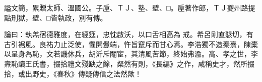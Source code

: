 \begin{pinyinscope}
 謚文簡，累贈太師、溫國公。子垕、ＴＪ、塾、壁、□。垕著作郎，ＴＪ夔州路提點刑獄，壁、□皆執政，別有傳。



 論曰：執羔宿德雅度，在經筵，忠忱啟沃，以口舌相高為
 戒。希呂剛直懇切，有古引裾風。良祐力止泛使，懼開釁端，忤旨竄斥而甘心焉。李浩獨不造秦熹，陳橐以呈身為恥，文若譏休兵，胡沂斥閹宦，其清風苦節，終始弗渝。高、孝之世，李燾恥讀王氏書，掇拾禮文殘缺之餘，粲然有則，《長編》之作，咸稱史才，然所掇拾，或出野史，《春秋》傳疑傳信之法然歟！



\end{pinyinscope}